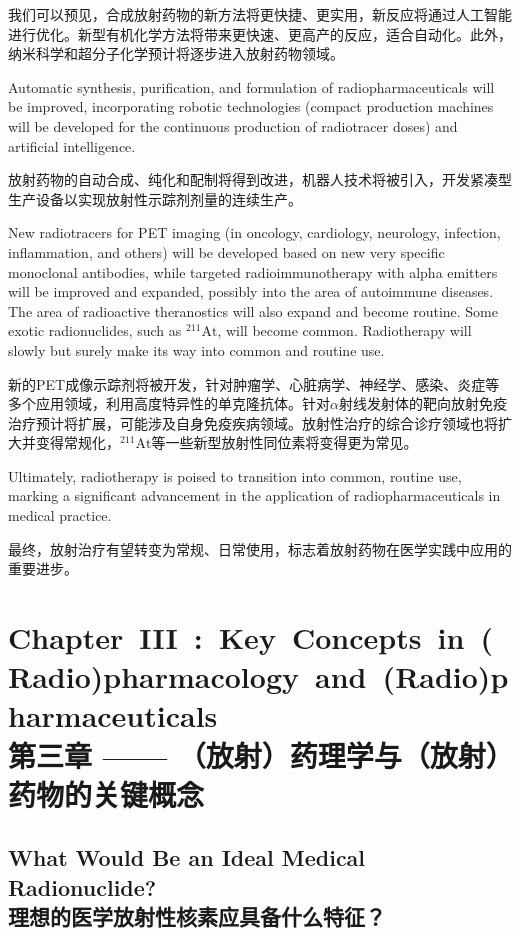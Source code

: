 \documentclass[dvipsnames, svgnames,a4paper,11pt]{article}
\begin{document}
我们可以预见，合成放射药物的新方法将更快捷、更实用，新反应将通过人工智能进行优化。新型有机化学方法将带来更快速、更高产的反应，适合自动化。此外，纳米科学和超分子化学预计将逐步进入放射药物领域。

Automatic synthesis, purification, and formulation of radiopharmaceuticals will be improved, incorporating robotic technologies (compact production machines will be developed for the continuous production of radiotracer doses) and artificial intelligence.  

放射药物的自动合成、纯化和配制将得到改进，机器人技术将被引入，开发紧凑型生产设备以实现放射性示踪剂剂量的连续生产。

New radiotracers for PET imaging (in oncology, cardiology, neurology, infection, inflammation, and others) will be developed based on new very specific monoclonal antibodies, while targeted radioimmunotherapy with alpha emitters will be improved and expanded, possibly into the area of autoimmune diseases. The area of radioactive theranostics will also expand and become routine. Some exotic radionuclides, such as \(\mathrm{^{211}At}\), will become common. Radiotherapy will slowly but surely make its way into common and routine use.

新的PET成像示踪剂将被开发，针对肿瘤学、心脏病学、神经学、感染、炎症等多个应用领域，利用高度特异性的单克隆抗体。针对$\alpha$射线发射体的靶向放射免疫治疗预计将扩展，可能涉及自身免疫疾病领域。放射性治疗的综合诊疗领域也将扩大并变得常规化，${}^{211}\text{At}$等一些新型放射性同位素将变得更为常见。

Ultimately, radiotherapy is poised to transition into common, routine use, marking a significant advancement in the application of radiopharmaceuticals in medical practice.

最终，放射治疗有望转变为常规、日常使用，标志着放射药物在医学实践中应用的重要进步。

\newpage

\section{\mbox{Chapter III : Key Concepts in (Radio)pharmacology and (Radio)pharmaceuticals}\\第三章 —— （放射）药理学与（放射）药物的关键概念}

\subsection{What Would Be an Ideal Medical Radionuclide?\\理想的医学放射性核素应具备什么特征？}
\end{document}
